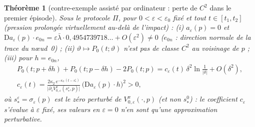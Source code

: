 \documentclass[11pt,a4paper]{article}
\newtheorem{theoreme}{Théorème}
\theoremstyle{remark}
\newcommand{\vth}{\vartheta}
\newcommand{\D}{\mathrm D}
\begin{document}
\begin{theoreme}[contre-exemple assisté par ordinateur : perte de $C^2$ dans le premier épisode]\label{prop:premier}
Sous le protocole $\Pi$, pour $0<\varepsilon<\varepsilon_0$ fixé et tout $t\in[t_1,t_2]$ (pression prolongée virtuellement au-delà de l'impact) : (i) $a_\varepsilon(p)=0$ et $\D a_\varepsilon(p)\cdot e_{0n}=\varepsilon\bar\lambda\cdot0{,}4954739718\ldots+O(\varepsilon^2)\ne0$ ($e_{0n}$ : direction normale de la trace du nœud~0) ; (ii) $\vth\mapsto P_0(t;\vth)$ n'est pas de classe $C^2$ au voisinage de $p$ ; (iii) pour $h=e_{0n}$,
\begin{gather*}
P_0(t;p+\delta h)+P_0(t;p-\delta h)-2P_0(t;p)=c_\varepsilon(t)\,\delta^2\ln\tfrac1{\lvert\delta\rvert}+O(\delta^2),\\
c_\varepsilon(t)=\frac{2\kappa_2\,e^{-\kappa_3\,(t-s_*^\varepsilon)}}{\bigl\lvert\partial_sV^x_{0,\varepsilon}(s_*^\varepsilon,p)\bigr\rvert}\,\bigl(\D a_\varepsilon(p)\cdot h\bigr)^2>0 ,
\end{gather*}
où $s_*^\varepsilon=\sigma_\varepsilon(p)$ est le zéro \emph{perturbé} de $V^x_{0,\varepsilon}(\cdot,p)$ (et non $s_*^0$) : le coefficient $c_\varepsilon$ s'évalue à $\varepsilon$ fixé, ses valeurs en $\varepsilon=0$ n'en sont qu'une approximation perturbative.
\end{theoreme}
\end{document}
